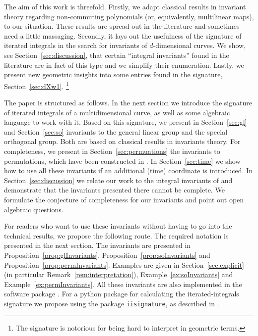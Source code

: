 \documentclass{scrartcl}
\theoremstyle{plain}
\theoremstyle{definition}
\newcommand{\1}[1]{1_{\{#1\}}}
\newcommand{\ds}{d} %
\begin{document}
The aim of this work is threefold.
%
Firstly, we adapt classical results in invariant theory
regarding non-commuting polynomials (or, equivalently, multilinear maps),
to our situation.
These results are spread out in the literature and sometimes need a little massaging.
%
%
Secondly, it lays out the usefulness of the signature of iterated integrals
in the search for invariants of $\ds$-dimensional curves.
We show, see Section~\ref{sec:discussion}, that certain ``integral invariants''
found in the literature are in fact of this type and we simplify their enumeration.
%
Lastly, we present new geometric insights into some entries found in the signature,
Section~\ref{sec:dXw1}.%
\footnote{The signature is notorious for being hard to interpret in geometric terms.}


The paper is structured as follows.
%
In the next section we introduce the signature of iterated integrals of a multidimensional curve,
as well as some algebraic language to work with it.
%
Based on this signature,
we present in Section~\ref{sec:gl} and Section~\ref{sec:so}
invariants to the general linear group and the special orthogonal group.
Both are based on classical results in invariants theory.
%
For completeness, we present in Section~\ref{sec:permuations} the invariants to permutations,
which have been constructed in \cite{bib:BRRZ2005}.
%
In Section~\ref{sec:time} we show how to use all these invariants if
an additional (time) coordinate is introduced.
%
In Section~\ref{sec:discussion} we relate our work to the integral invariants of \cite{bib:FKK2010}
and demonstrate that the invariants presented there cannot be complete.
%
We formulate the conjecture of completeness for our invariants and point out open algebraic questions.

For readers who want to use these invariants without having to go into the technical results, we propose the following route.
%
The required notation is presented in the next section.
%
The invariants are presented in Proposition~\ref{prop:glInvariants}, Proposition~\ref{prop:soInvariants} and Proposition~\ref{prop:permInvariants}.
Examples are given in Section~\ref{sec:explicit} (in particular Remark~\ref{rem:interpretation}), Example~\ref{ex:soInvariants} and Example~\ref{ex:permInvariants}.
%
All these invariants are also implemented in the software package \cite{bib:Die2018}.
%
For a python package for calculating the iterated-integrals signature we propose using the package \verb|iisignature|, as described in \cite{bib:Rei2017}.
\end{document}
